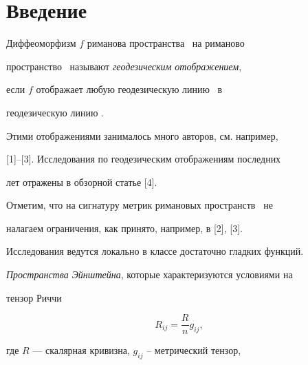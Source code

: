 \date{}




\pagestyle{plain} %







\maketitle


\label{begin}








\section{Введение}





Диффеоморфизм $f$ риманова пространства \vn\ на риманово


пространство \vnn\ называют {\it геодезическим отображением},


если $f$ отображает любую геодезическую линию \vn\ в


геодезическую линию \vnn. 


Этими отображениями занималось много авторов, см. например,


[1]--[3]. Исследования по геодезическим отображениям последних


лет отражены в обзорной статье [4]. 





Отметим, что на сигнатуру метрик римановых пространств \vn\ не


налагаем ограничения, как принято, например, в [2], [3]. 


Исследования ведутся локально в классе достаточно гладких функций.





{\it Пространства Эйнштейна}, которые характеризуются условиями на


тензор Риччи


$$


R_{ij}=\frac Rn g_{ij},


$$


где $R$ --- скалярная кривизна, $g_{ij}$ -- метрический тензор,


